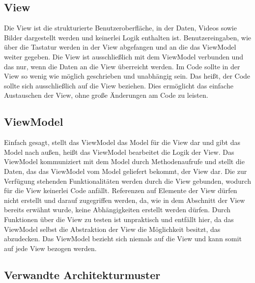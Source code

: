 \subsection*{View}
Die View ist die strukturierte Benutzeroberfl\"ache, in der Daten, Videos sowie Bilder dargestellt werden und keinerlei Logik enthalten ist. Benutzereingaben, wie \"uber die Tastatur werden in der View abgefangen und an die das ViewModel weiter gegeben. Die View ist ausschlie\ss{}lich mit dem ViewModel verbunden und das nur, wenn die Daten an die View \"uberreicht werden. Im Code sollte in der View so wenig wie m\"oglich geschrieben und unabh\"angig sein. Das hei\ss{}t, der Code sollte sich ausschlie\ss{}lich auf die View beziehen. Dies erm\"oglicht das einfache Austauschen der View, ohne gro\ss{}e \"Anderungen am Code zu leisten\cite{EderView2017}.

\subsection*{ViewModel}
Einfach gesagt, stellt das ViewModel das Model f\"ur die View dar und gibt das Model nach au\ss{}en, hei\ss{}t das ViewModel bearbeitet die Logik der View. 
Das ViewModel kommuniziert mit dem Model  durch Methodenaufrufe und stellt die Daten, das das ViewModel vom Model geliefert bekommt, der View dar. Die zur Verf\"ugung stehenden Funktionalit\"aten werden durch die View gebunden, wodurch f\"ur die View keinerlei Code anf\"allt.
Referenzen auf Elemente der View d\"urfen nicht erstellt und darauf zugegriffen werden, da, wie in dem Abschnitt der View bereits erw\"ahnt wurde, keine Abh\"angigkeiten erstellt werden d\"urfen. Durch Funktionen \"uber die View zu testen ist unpraktisch und entf\"allt hier, da das ViewModel selbst die Abstraktion der View die M\"oglichkeit besitzt, das abzudecken.
Das ViewModel bezieht sich niemals auf die View und kann somit auf jede View bezogen werden\cite{EderViewModel2017}.

\subsection{Verwandte Architekturmuster}

 
 
